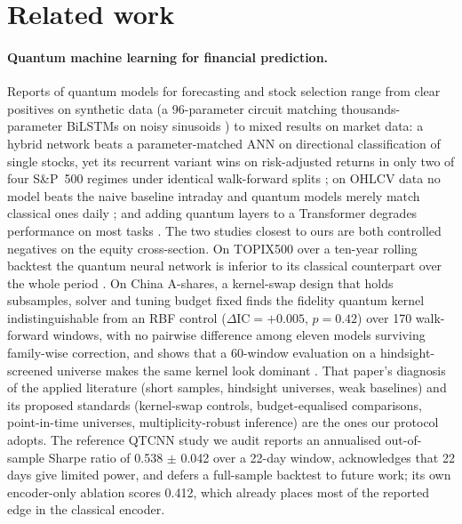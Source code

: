 \section{Related work}
\label{sec:related}

\paragraph{Quantum machine learning for financial prediction.}
Reports of quantum models for forecasting and stock selection range from
clear positives on synthetic data (a 96-parameter circuit matching
thousands-parameter BiLSTMs on noisy sinusoids \citep{emmanoulopoulos2022quantum}) to mixed results on market data: a hybrid network beats a parameter-matched
ANN on directional classification of single stocks, yet its recurrent variant
wins on risk-adjusted returns in only two of four S\&P~500 regimes under
identical walk-forward splits \citep{ahmad2026quantum}; on OHLCV data no
model beats the naive baseline intraday and quantum models merely match
classical ones daily \citep{shah2026stock}; and adding quantum layers to a
Transformer degrades performance on most tasks \citep{chen2025quantumd}. The
two studies closest to ours are both controlled negatives on the equity
cross-section. On TOPIX500 over a ten-year rolling backtest the quantum neural
network is inferior to its classical counterpart over the whole period
\citep{kobayashi2023cross}. On China A-shares, a kernel-swap design that holds
subsamples, solver and tuning budget fixed finds the fidelity quantum kernel
indistinguishable from an RBF control ($\Delta\mathrm{IC}=+0.005$, $p=0.42$)
over 170 walk-forward windows, with no pairwise difference among eleven models
surviving family-wise correction, and shows that a 60-window evaluation on a
hindsight-screened universe makes the same kernel look dominant
\citep{shen2026quantum}. That paper's diagnosis of the applied literature
(short samples, hindsight universes, weak baselines) and its proposed
standards (kernel-swap controls, budget-equalised comparisons, point-in-time
universes, multiplicity-robust inference) are the ones our protocol adopts. The
reference QTCNN study we audit \citep{chen2025quantumb} reports an annualised
out-of-sample Sharpe ratio of \num{0.538} $\pm$ \num{0.042} over a 22-day
window, acknowledges that 22 days give limited power, and defers a full-sample
backtest to future work; its own encoder-only ablation scores \num{0.412},
which already places most of the reported edge in the classical encoder.

